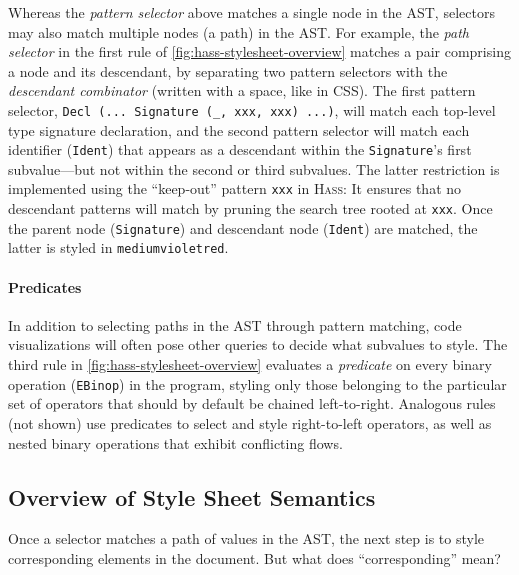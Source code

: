 \documentclass[acmsmall, screen]{acmart}
\newcommand{\parahead}[1]
  {\paragraph{\textbf{#1}}}
\newcommand{\hass}
{\textsc{Hass}}
\newcommand{\cssAttr}[1]
{\texttt{#1}}
\begin{document}
Whereas the \emph{pattern selector} above matches a single node in the AST, selectors may also match multiple nodes (a path) in the AST.
For example, the \emph{path selector} in the first rule of \autoref{fig:hass-stylesheet-overview} matches a pair comprising a node and its descendant, by separating two pattern selectors with the \emph{descendant combinator} (written with a space, like in CSS).
The first pattern selector, \texttt{Decl (... Signature (\_, xxx, xxx) ...)}, will match each top-level type signature declaration, and the second pattern selector will match each identifier (\texttt{Ident}) that appears as a descendant within the \texttt{Signature}'s first subvalue---but not within the second or third subvalues.
The latter restriction is implemented using the ``keep-out'' pattern \texttt{xxx} in \hass{}: It ensures that no descendant patterns will match by pruning the search tree rooted at \texttt{xxx}.
Once the parent node (\texttt{Signature}) and descendant node (\texttt{Ident}) are matched, the latter is styled in \cssAttr{mediumvioletred}.




\parahead{Predicates}

In addition to selecting paths in the AST through pattern matching, code visualizations will often pose other queries to decide what subvalues to style.
The third rule in \autoref{fig:hass-stylesheet-overview} evaluates a \emph{predicate} on every binary operation (\texttt{EBinop}) in the program, styling only those belonging to the particular set of operators that should by default be chained left-to-right.
Analogous rules (not shown) use predicates to select and style right-to-left operators, as well as nested binary operations that exhibit conflicting flows.


 \subsection{Overview of Style Sheet Semantics}
\label{sec:overview-provenance}

\newcommand{\emphTerm}[1]
{\textbf{#1}}

Once a selector matches a path of values in the AST, the next step is to style corresponding elements in the document.
But what does ``corresponding'' mean?


\setlength\fboxsep{0pt}

\newcommand{\diffAdd}[1]{\colorbox{yellow!20}{#1}}

\newcommand{\astNode}{\raisebox{0.003in}{\texttt{[image: letters/ast-node.pdf]}}}
\newcommand{\justNode}{\raisebox{0.003in}{\texttt{[image: letters/just-node.pdf]}}}
\newcommand{\nothingNode}{\raisebox{0.003in}{\texttt{[image: letters/nothing-node.pdf]}}}
\end{document}
